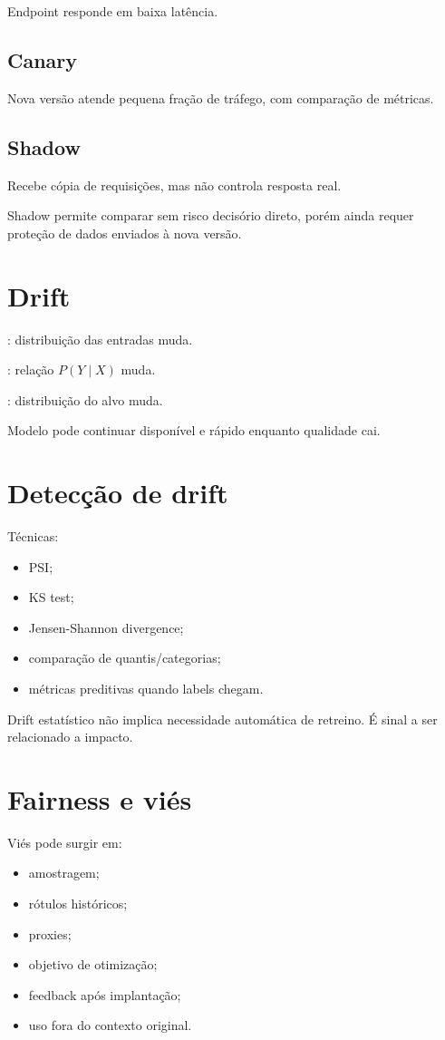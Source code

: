 Endpoint responde em baixa latência.

\subsection{Canary}

Nova versão atende pequena fração de tráfego, com comparação de métricas.

\subsection{Shadow}

Recebe cópia de requisições, mas não controla resposta real.

Shadow permite comparar sem risco decisório direto, porém ainda requer proteção de dados enviados à nova versão.

\section{Drift}

: distribuição das entradas muda.

: relação $P(Y\mid X)$ muda.

: distribuição do alvo muda.

Modelo pode continuar disponível e rápido enquanto qualidade cai.

\section{Detecção de drift}

Técnicas:
\begin{itemize}
\item PSI;
\item KS test;
\item Jensen-Shannon divergence;
\item comparação de quantis/categorias;
\item métricas preditivas quando labels chegam.
\end{itemize}

Drift estatístico não implica necessidade automática de retreino. É sinal a ser relacionado a impacto.

\section{Fairness e viés}

Viés pode surgir em:
\begin{itemize}
\item amostragem;
\item rótulos históricos;
\item proxies;
\item objetivo de otimização;
\item feedback após implantação;
\item uso fora do contexto original.
\end{itemize}

